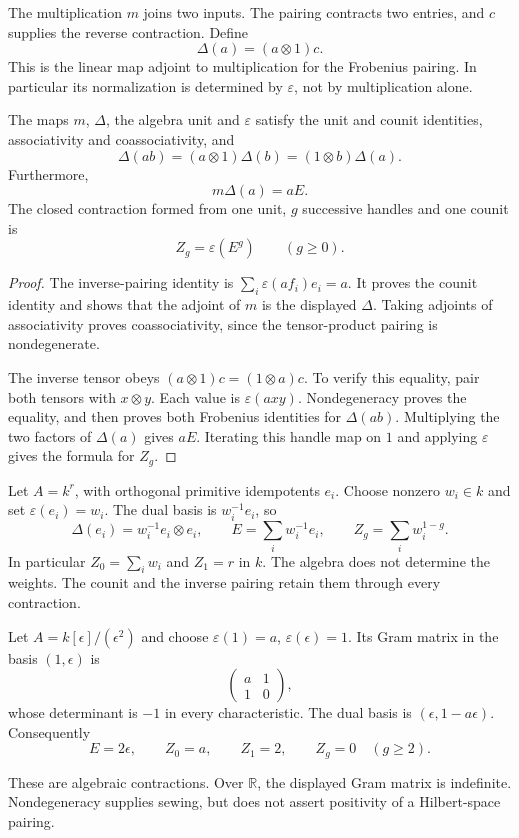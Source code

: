 The multiplication $m$ joins two inputs. The pairing contracts two entries,
and $c$ supplies the reverse contraction. Define
\[
 \Delta(a)=(a\otimes1)c.
\]
This is the linear map adjoint to multiplication for the Frobenius pairing.
In particular its normalization is determined by $\varepsilon$, not by
multiplication alone.

\begin{proposition}
\label{v4-arith:traces:finite-sewing}
The maps $m$, $\Delta$, the algebra unit and $\varepsilon$ satisfy the unit
and counit identities, associativity and coassociativity, and
\[
 \Delta(ab)=(a\otimes1)\Delta(b)
            =(1\otimes b)\Delta(a).
\]
Furthermore,
\[
 m\Delta(a)=aE.
\]
The closed contraction formed from one unit, $g$ successive handles and one
counit is
\[
 Z_g=\varepsilon(E^g)\qquad(g\geq0).
\]
\end{proposition}
\begin{proof}
The inverse-pairing identity is $\sum_i\varepsilon(af_i)e_i=a$. It proves
the counit identity and shows that the adjoint of $m$ is the displayed
$\Delta$. Taking adjoints of associativity proves coassociativity, since the
tensor-product pairing is nondegenerate.

The inverse tensor obeys $(a\otimes1)c=(1\otimes a)c$. To verify this
equality, pair both tensors with $x\otimes y$. Each value is
$\varepsilon(axy)$. Nondegeneracy proves the equality, and then proves both
Frobenius identities for $\Delta(ab)$. Multiplying the two factors of
$\Delta(a)$ gives $aE$. Iterating this handle map on $1$ and applying
$\varepsilon$ gives the formula for $Z_g$.
\end{proof}

\begin{example}
\label{v4-arith:traces:semisimple-weights}
Let $A=k^r$, with orthogonal primitive idempotents $e_i$. Choose nonzero
$w_i\in k$ and set $\varepsilon(e_i)=w_i$. The dual basis is $w_i^{-1}e_i$,
so
\[
 \Delta(e_i)=w_i^{-1}e_i\otimes e_i,\qquad
 E=\sum_i w_i^{-1}e_i,\qquad
 Z_g=\sum_i w_i^{1-g}.
\]
In particular $Z_0=\sum_i w_i$ and $Z_1=r$ in $k$. The algebra does not
determine the weights. The counit and the inverse pairing retain them
through every contraction.
\end{example}

\begin{example}
\label{v4-arith:traces:nilpotent-frobenius}
Let $A=k[\epsilon]/(\epsilon^2)$ and choose $\varepsilon(1)=a$,
$\varepsilon(\epsilon)=1$. Its Gram matrix in the basis $(1,\epsilon)$ is
\[
 \begin{pmatrix}a&1\\1&0\end{pmatrix},
\]
whose determinant is $-1$ in every characteristic. The dual basis is
$(\epsilon,1-a\epsilon)$. Consequently
\[
 E=2\epsilon,\qquad Z_0=a,\qquad Z_1=2,
 \qquad Z_g=0\quad(g\geq2).
\]

These are algebraic contractions. Over $\mathbb R$, the displayed Gram
matrix is indefinite. Nondegeneracy supplies sewing, but does not assert
positivity of a Hilbert-space pairing.
\end{example}

